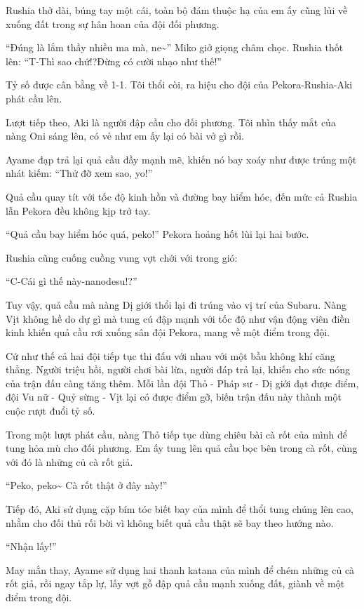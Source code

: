 \documentclass[../main.tex]{subfiles}
\begin{document}
Rushia thở dài, búng tay một cái, toàn bộ đám thuộc hạ của em ấy cũng lủi về xuống đất trong sự hân hoan của đội đối phương.

``Đúng là lắm thầy nhiều ma mà, ne\~{}'' Miko giở giọng châm chọc. Rushia thốt lên: ``T-Thì sao chứ!?Đừng có cười nhạo như thế!''

Tỷ số được cân bằng về 1-1. Tôi thổi còi, ra hiệu cho đội của Pekora-Rushia-Aki phát cầu lên.

Lượt tiếp theo, Aki là người đập cầu cho đối phương. Tôi nhìn thấy mắt của nàng Oni sáng lên, có vẻ như em ấy lại có bài vở gì rồi.

Ayame đạp trả lại quả cầu đầy mạnh mẽ, khiến nó bay xoáy như được trúng một nhát kiếm: ``Thử đỡ xem sao, yo!''

Quả cầu quay tít với tốc độ kinh hồn và đường bay hiểm hóc, đến mức cả Rushia lẫn Pekora đều không kịp trở tay.

``Quả cầu bay hiểm hóc quá, peko!'' Pekora hoảng hốt lùi lại hai bước.

Rushia cũng cuống cuồng vung vợt chới với trong gió:

``C-Cái gì thế này-nanodesu!?''

Tuy vậy, quả cầu mà nàng Dị giới thổi lại đi trúng vào vị trí của Subaru. Nàng Vịt không hề do dự gì mà tung cú đập mạnh với tốc độ như vận động viên điền kinh khiến quả cầu rơi xuống sân đội Pekora, mang về một điểm trong đội.

Cứ như thế cả hai đội tiếp tục thi đấu với nhau với một bầu không khí căng thẳng. Người triệu hồi, người chơi bài lừa, người đáp trả lại, khiến cho sức nóng của trận đấu càng tăng thêm. Mỗi lần đội Thỏ - Pháp sư - Dị giới đạt được điểm, đội Vu nữ - Quỷ sừng - Vịt lại có được điểm gỡ, biến trận đấu này thành một cuộc rượt đuổi tỷ số.

Trong một lượt phát cầu, nàng Thỏ tiếp tục dùng chiêu bài cà rốt của mình để tung hỏa mù cho đối phương. Em ấy tung lên quả cầu bọc bên trong cà rốt, cùng với đó là những củ cà rốt giả.

``Peko, peko\~{} Cà rốt thật ở đây này!''

Tiếp đó, Aki sử dụng cặp bím tóc biết bay của mình để thổi tung chúng lên cao, nhằm cho đối thủ rối bời vì không biết quả cầu thật sẽ bay theo hướng nào.

``Nhận lấy!''

May mắn thay, Ayame sử dụng hai thanh katana của mình để chém những củ cà rốt giả, rồi ngay tắp lự, lấy vợt gỗ đập quả cầu mạnh xuống đất, giành về một điểm trong đội.
\end{document}
